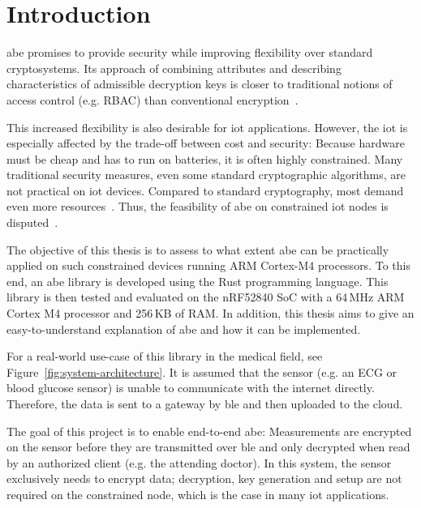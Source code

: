 
\chapter{Introduction}\label{chapter:introduction}

\acrfull{abe} promises to provide security while improving flexibility over standard cryptosystems.
Its approach of combining \glspl{attribute} and  describing characteristics of admissible decryption keys is closer to traditional notions of access control (e.g. RBAC) than conventional encryption~\cite{bethencourt_ciphertext-policy_2007}.

This increased flexibility is also desirable for \acrfull{iot} applications.
However, the \acrshort{iot} is especially affected by the trade-off between cost and security:
Because hardware must be cheap and has to run on batteries, it is often highly constrained.
Many traditional security measures, even some standard cryptographic algorithms, are not practical on \acrshort{iot} devices.
Compared to standard cryptography, most  demand even more resources~\cite{wang_performance_2014}.
Thus, the feasibility of \acrshort{abe} on constrained \acrshort{iot} nodes is disputed~\cite{ambrosin_feasibility_2016,ambrosin_feasibility_2015,borgh_attribute-based_2016,girgenti_feasibility_2019,wang_performance_2014}.

The objective of this thesis is to assess to what extent \acrshort{abe} can be practically applied on such constrained devices running ARM Cortex-M4 processors.
To this end, an \acrshort{abe} library is developed using the Rust programming language.
This library is then tested and evaluated on the nRF52840 SoC with a 64\,MHz ARM Cortex M4 processor and 256\,KB of RAM.
In addition, this thesis aims to give an easy-to-understand explanation of \acrshort{abe} and how it can be implemented.



For a real-world use-case of this library in the medical field, see Figure~\ref{fig:system-architecture}.
It is assumed that the sensor (e.g. an ECG or blood glucose sensor) is unable to communicate with the internet directly.
Therefore, the data is sent to a gateway by \acrfull{ble} and then uploaded to the cloud.

The goal of this project is to enable end-to-end \acrlong{abe}:
Measurements are encrypted on the sensor before they are transmitted over \acrshort{ble} and only decrypted when read by an authorized client (e.g. the attending doctor).
In this system, the sensor exclusively needs to encrypt data; decryption, key generation and setup are not required on the constrained node, which is the case in many \acrshort{iot} applications.

